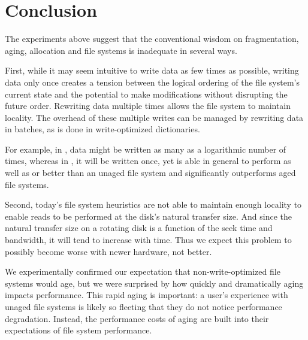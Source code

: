 \section{Conclusion}\label{sec:fsa-conclusion}

The experiments above suggest that the conventional wisdom on fragmentation, aging,
allocation and file systems is inadequate in several ways.

First, while it may seem intuitive to write data as few times as possible,
writing data only once creates a tension between the logical ordering
of the file system's current state and the potential to make modifications
without disrupting the future order. Rewriting data
multiple times allows the file system to maintain locality.  The overhead
of these multiple writes can be managed by rewriting data in batches, as is done in
write-optimized dictionaries.


For example, in \betrfs, data might be written as many as a
logarithmic number of times, whereas in \ext, it will be written once,
yet \betrfs is able in general to perform as well as or better than an
unaged \ext file system and significantly outperforms aged \ext file
systems.

Second, today's file system heuristics are not able to maintain enough
locality to enable reads to be performed at the disk's natural transfer
size.  And since the natural transfer size on a rotating disk is a
function of the seek time and bandwidth, it will tend to increase with
time. Thus we expect this problem to possibly become worse with newer
hardware, not better.

We experimentally confirmed our expectation that non-write-optimized
file systems would age, but we were surprised by how
quickly and dramatically aging impacts performance.
This rapid aging is important: a user's
experience with unaged
file systems is likely so fleeting that they do not notice performance degradation.
Instead, the performance costs of aging
are built into their expectations of file system performance.


